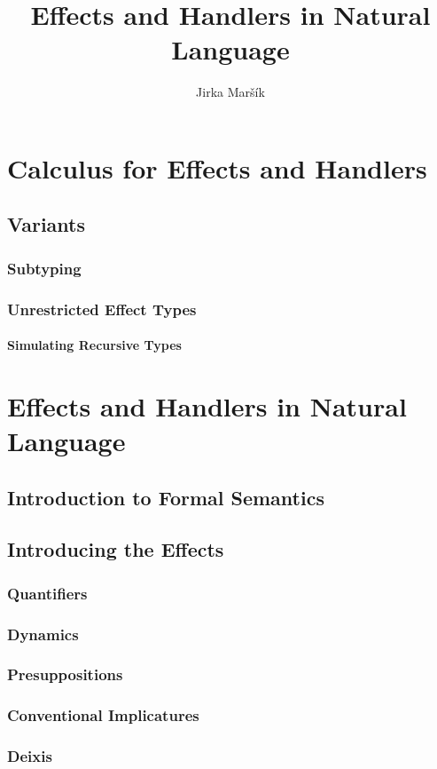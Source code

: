 \documentclass{report}
\title{Effects and Handlers in Natural Language}
\author{Jirka Maršík}
\begin{document}
\maketitle

\tableofcontents



\part{Calculus for Effects and Handlers}









\chapter{Variants}
\section{Subtyping}
\label{sec:subtyping}
\section{Unrestricted Effect Types}
\subsection{Simulating Recursive Types}



\part{Effects and Handlers in Natural Language}

\chapter{Introduction to Formal Semantics}
\label{chap:intro-fs}

\chapter{Introducing the Effects}
\section{Quantifiers}
\section{Dynamics}
\section{Presuppositions}
\section{Conventional Implicatures}
\section{Deixis}





\end{document}
